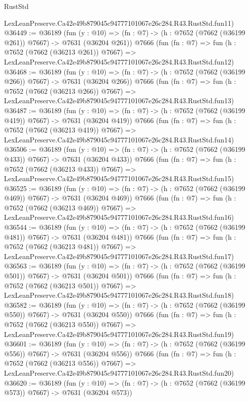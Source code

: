 \begin{lexlean}{RustStd}
\begin{coremodule}
    LexLeanPreserve.Ca42e49b879045c94777101067e26c284.R43.RustStd.fun11)
@36449 := @36189
    (fun (y : @10) => (fn : @7) -> (h : @7652 (@7662 (@36199 @261)) @7667) -> @7631 (@36204 @261))
    @7666
    (fun (fn : @7) =>
    fun (h : @7652 (@7662 (@36213 @261)) @7667) =>
    LexLeanPreserve.Ca42e49b879045c94777101067e26c284.R43.RustStd.fun12)
@36468 := @36189
    (fun (y : @10) => (fn : @7) -> (h : @7652 (@7662 (@36199 @266)) @7667) -> @7631 (@36204 @266))
    @7666
    (fun (fn : @7) =>
    fun (h : @7652 (@7662 (@36213 @266)) @7667) =>
    LexLeanPreserve.Ca42e49b879045c94777101067e26c284.R43.RustStd.fun13)
@36487 := @36189
    (fun (y : @10) => (fn : @7) -> (h : @7652 (@7662 (@36199 @419)) @7667) -> @7631 (@36204 @419))
    @7666
    (fun (fn : @7) =>
    fun (h : @7652 (@7662 (@36213 @419)) @7667) =>
    LexLeanPreserve.Ca42e49b879045c94777101067e26c284.R43.RustStd.fun14)
@36506 := @36189
    (fun (y : @10) => (fn : @7) -> (h : @7652 (@7662 (@36199 @433)) @7667) -> @7631 (@36204 @433))
    @7666
    (fun (fn : @7) =>
    fun (h : @7652 (@7662 (@36213 @433)) @7667) =>
    LexLeanPreserve.Ca42e49b879045c94777101067e26c284.R43.RustStd.fun15)
@36525 := @36189
    (fun (y : @10) => (fn : @7) -> (h : @7652 (@7662 (@36199 @469)) @7667) -> @7631 (@36204 @469))
    @7666
    (fun (fn : @7) =>
    fun (h : @7652 (@7662 (@36213 @469)) @7667) =>
    LexLeanPreserve.Ca42e49b879045c94777101067e26c284.R43.RustStd.fun16)
@36544 := @36189
    (fun (y : @10) => (fn : @7) -> (h : @7652 (@7662 (@36199 @481)) @7667) -> @7631 (@36204 @481))
    @7666
    (fun (fn : @7) =>
    fun (h : @7652 (@7662 (@36213 @481)) @7667) =>
    LexLeanPreserve.Ca42e49b879045c94777101067e26c284.R43.RustStd.fun17)
@36563 := @36189
    (fun (y : @10) => (fn : @7) -> (h : @7652 (@7662 (@36199 @501)) @7667) -> @7631 (@36204 @501))
    @7666
    (fun (fn : @7) =>
    fun (h : @7652 (@7662 (@36213 @501)) @7667) =>
    LexLeanPreserve.Ca42e49b879045c94777101067e26c284.R43.RustStd.fun18)
@36582 := @36189
    (fun (y : @10) => (fn : @7) -> (h : @7652 (@7662 (@36199 @550)) @7667) -> @7631 (@36204 @550))
    @7666
    (fun (fn : @7) =>
    fun (h : @7652 (@7662 (@36213 @550)) @7667) =>
    LexLeanPreserve.Ca42e49b879045c94777101067e26c284.R43.RustStd.fun19)
@36601 := @36189
    (fun (y : @10) => (fn : @7) -> (h : @7652 (@7662 (@36199 @556)) @7667) -> @7631 (@36204 @556))
    @7666
    (fun (fn : @7) =>
    fun (h : @7652 (@7662 (@36213 @556)) @7667) =>
    LexLeanPreserve.Ca42e49b879045c94777101067e26c284.R43.RustStd.fun20)
@36620 := @36189
    (fun (y : @10) => (fn : @7) -> (h : @7652 (@7662 (@36199 @573)) @7667) -> @7631 (@36204 @573))

\end{coremodule}
\end{lexlean}
